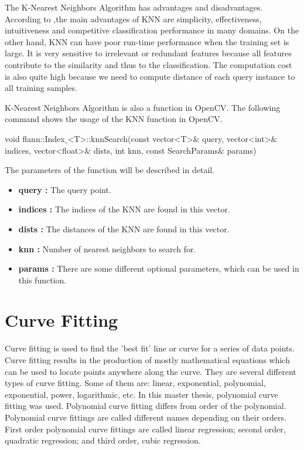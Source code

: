 The K-Nearest Neighbors Algorithm has advantages and disadvantages. According to \cite{k_nearest_neighbors_adv_disadv},the main advantages of KNN are simplicity, effectiveness, intuitiveness and competitive classification performance in many domains. On the other hand, KNN can have poor run-time performance when the training set is large. It is very sensitive to irrelevant or redundant features because all features contribute to the similarity and thus to the classification. The computation cost is also quite high because we need to compute distance of each query instance to all training samples. 

K-Nearest Neighbors Algorithm is also a function in OpenCV. The following command shows the usage of the KNN function in OpenCV.

\begin{center}

void flann::Index$\_$<T>::knnSearch(const vector<T>$\&$ query, vector<int>$\&$ indices, vector<float>$\&$ dists, int knn, const SearchParams$\&$ params)

\end{center}

The parameters of the function will be described in detail.\cite{k_nearest_neighbors_OpenCV}

\begin{itemize}

\item \textbf{query : }The query point.

\item \textbf{indices : }The indices of the KNN are found in this vector.

\item \textbf{dists : }The distances of the KNN are found in this vector.

\item \textbf{knn : }Number of nearest neighbors to search for.

\item \textbf{params : }There are some different optional parameters, which can be used in this function.

\end{itemize}


%
\section{Curve Fitting}\label{sec:Curve Fitting}

Curve fitting is used to find the 'best fit' line or curve for a series of data points. Curve fitting results in the production of mostly mathematical equations which can be used to locate points anywhere along the curve.\cite{Curve_Fitting} They are several different types of curve fitting. Some of them are: linear, exponential, polynomial, exponential, power, logarithmic, etc. In this master thesis, polynomial curve fitting was used. Polynomial curve fitting differs from order of the polynomial. Polynomial curve fittings are called different names depending on their orders. First order polynomial curve fittings are called linear regression; second order, quadratic regression; and third order, cubic regression.


